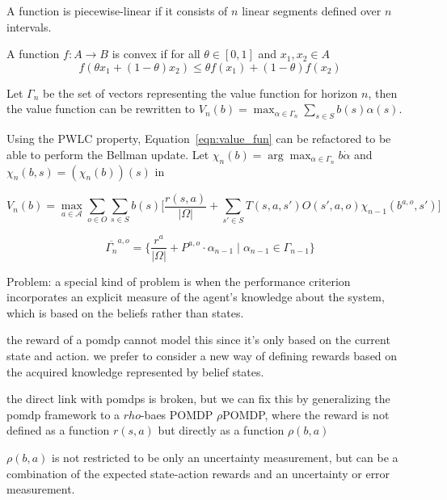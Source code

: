 \begin{definition}
	A function is piecewise-linear if it consists of $n$ linear segments defined over $n$ intervals.
\end{definition}

\begin{definition}
	A function $f:A\to B$ is convex if for all $\theta\in[0,1]$ and $x_1,x_2\in A$
	\begin{equation*}
		f(\theta x_1 + (1-\theta) x_2)\leq \theta f(x_1) + (1-\theta)f(x_2)
	\end{equation*}
\end{definition}

Let $\Gamma_n$ be the set of vectors representing the value function for horizon $n$, then the value function can be rewritten to $V_n(b)=\max_{\alpha\in\Gamma_n}\sum_{s\in S} b(s)\alpha(s)$. 

Using the PWLC property, Equation~\ref{eqn:value_fun} can be refactored to be able to perform the Bellman update. Let $\chi_n(b)=\arg\max_{\alpha\in \Gamma_n} b\dot\alpha$ and $\chi_n(b,s)=(\chi_n(b))(s)$ in 

\begin{equation}
	V_n(b) = \max_{a\in \mathcal{A}}\sum_{o\in O}\sum_{s\in S}b(s)\big[\frac{r(s,a)}{|\Omega|} + \sum_{s'\in S}T(s,a,s')O(s',a,o)\chi_{n-1}(b^{a,o},s')\big]
\end{equation}

\begin{equation}
	\overline{\Gamma_n}^{a,o}=\{ \frac{r^a}{|\Omega|}+P^{a,o}\cdot\alpha_{n-1}\mid\alpha_{n-1}\in\Gamma_{n-1} \}
\end{equation}


Problem:
a special kind of problem is when the performance criterion incorporates an explicit measure of the agent's knowledge about the system, which is based on the beliefs rather than states.

the reward of a pomdp cannot model this since it's only based on the current state and action.
we prefer to consider a new way of defining rewards based on the acquired knowledge represented by belief states.

the direct link with pomdps is broken, but we can fix this by generalizing the pomdp framework to a $rho$-baes POMDP $\rho$POMDP, where the reward is not defined as a function $r(s,a)$ but directly as a function $\rho(b,a)$

$\rho(b,a)$ is not restricted to be only an uncertainty measurement, but can be a combination of the expected state-action rewards and an uncertainty or error measurement.



